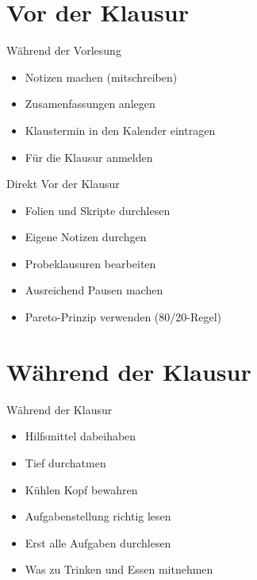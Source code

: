 

\section{Vor der Klausur}


\begin{frame}[c]{Während der Vorlesung}
    \Large
    \begin{itemize}[<+(1)->]
        \item Notizen machen (mitschreiben)
        \item Zusamenfassungen anlegen
        \item Klaustermin in den Kalender eintragen
        \item Für die Klausur anmelden
    \end{itemize}
\end{frame}


\begin{frame}[c]{Direkt Vor der Klausur}
    \Large
    \begin{itemize}[<+(1)->]
        \item Folien und Skripte durchlesen
        \item Eigene Notizen durchgen
        \item Probeklausuren bearbeiten
        \item Ausreichend Pausen machen
        \item Pareto-Prinzip verwenden (80/20-Regel)
    \end{itemize}
\end{frame}




\section{Während der Klausur}


\begin{frame}[c]{Während der Klausur}
    \Large
    \begin{itemize}[<+(1)->]
        \item Hilfsmittel dabeihaben
        \item Tief durchatmen
        \item Kühlen Kopf bewahren
        \item Aufgabenstellung richtig lesen
        \item Erst alle Aufgaben durchlesen
        \item Was zu Trinken und Essen mitnehmen
    \end{itemize}
\end{frame}


